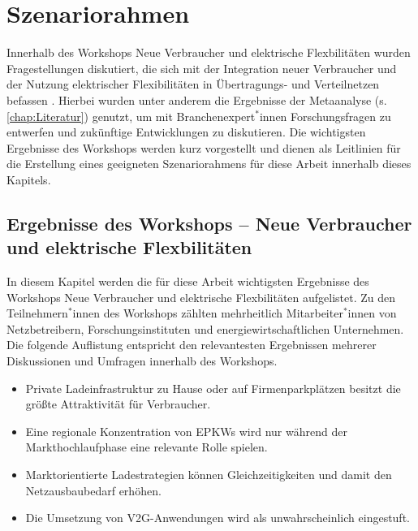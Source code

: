 
\section{Szenariorahmen}\label{chap:Szenariorahmen}

Innerhalb des Workshops \glqq Neue Verbraucher und elektrische Flexbilitäten\grqq{} wurden Fragestellungen diskutiert, die sich mit der Integration neuer Verbraucher und der Nutzung elektrischer Flexibilitäten in Übertragungs- und Verteilnetzen befassen \cite{RLI2020}.
Hierbei wurden unter anderem die Ergebnisse der Metaanalyse (s. \autoref{chap:Literatur}) genutzt, um mit Branchenexpert$^*$innen Forschungsfragen zu entwerfen und zukünftige Entwicklungen zu diskutieren.
Die wichtigsten Ergebnisse des Workshops werden kurz vorgestellt und dienen als Leitlinien für die Erstellung eines geeigneten Szenariorahmens für diese Arbeit innerhalb dieses Kapitels.


\subsection{Ergebnisse des Workshops {--} Neue Verbraucher und elektrische Flexbilitäten}

In diesem Kapitel werden die für diese Arbeit wichtigsten Ergebnisse des Workshops \glqq Neue Verbraucher und elektrische Flexbilitäten\grqq{} aufgelistet.
Zu den Teilnehmern$^*$innen des Workshops zählten mehrheitlich Mitarbeiter$^*$innen von Netzbetreibern, Forschungsinstituten und energiewirtschaftlichen Unternehmen.
Die folgende Auflistung entspricht den relevantesten Ergebnissen mehrerer Diskussionen und Umfragen innerhalb des Workshops.

\begin{itemize}
	\item Private Ladeinfrastruktur zu Hause oder auf Firmenparkplätzen besitzt die größte Attraktivität für Verbraucher.
	\item Eine regionale Konzentration von \glspl{EPKW} wird nur während der Markthochlaufphase eine relevante Rolle spielen.
	\item Marktorientierte Ladestrategien können Gleichzeitigkeiten und damit den Netzausbaubedarf erhöhen.
	\item Die Umsetzung von \gls{V2G}-Anwendungen wird als unwahrscheinlich eingestuft.
	
\end{itemize}


